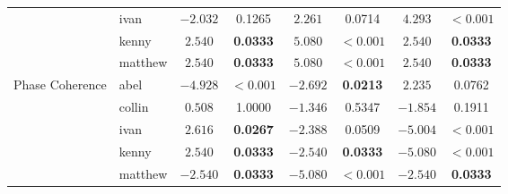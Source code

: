 \begin{table}[htbp]
\begin{tabular}{llcccccc}
      & ivan    & $-2.032$ & 0.1265 & $2.261$ & 0.0714 & $4.293$ & $\mathbf{<0.001}$ \\
      & kenny   & $2.540$ & \textbf{0.0333} & $5.080$ & $\mathbf{<0.001}$ & $2.540$ & \textbf{0.0333} \\
      & matthew & $2.540$ & \textbf{0.0333} & $5.080$ & $\mathbf{<0.001}$ & $2.540$ & \textbf{0.0333} \\
    \midrule
    \multirow{5}{*}{Phase Coherence}
      & abel    & $-4.928$ & $\mathbf{<0.001}$ & $-2.692$ & \textbf{0.0213} & $2.235$ & 0.0762 \\
      & collin  & $0.508$ & 1.0000 & $-1.346$ & 0.5347 & $-1.854$ & 0.1911 \\
      & ivan    & $2.616$ & \textbf{0.0267} & $-2.388$ & 0.0509 & $-5.004$ & $\mathbf{<0.001}$ \\
      & kenny   & $2.540$ & \textbf{0.0333} & $-2.540$ & \textbf{0.0333} & $-5.080$ & $\mathbf{<0.001}$ \\
      & matthew & $-2.540$ & \textbf{0.0333} & $-5.080$ & $\mathbf{<0.001}$ & $-2.540$ & \textbf{0.0333} \\
    \bottomrule
  \end{tabular}
\end{table}
